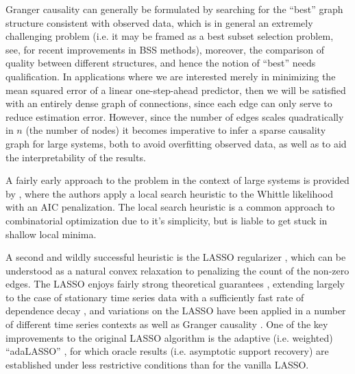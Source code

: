 \documentclass{statsoc}
\begin{document}
Granger causality can generally be formulated by searching for the
``best'' graph structure consistent with observed data, which is in
general an extremely challenging problem (i.e. it may be framed as a
best subset selection problem, see, \cite{hastie_bss_comp} for recent
improvements in BSS methods), moreover, the comparison of quality
between different structures, and hence the notion of ``best'' needs
qualification.  In applications where we are interested merely in
minimizing the mean squared error of a linear one-step-ahead
predictor, then we will be satisfied with an entirely dense graph of
connections, since each edge can only serve to reduce estimation
error.  However, since the number of edges scales quadratically in $n$
(the number of nodes) it becomes imperative to infer a sparse
causality graph for large systems, both to avoid overfitting observed
data, as well as to aid the interpretability of the results.

A fairly early approach to the problem in the context of large systems
is provided by \cite{bach2004learning}, where the authors apply a
local search heuristic to the Whittle likelihood with an AIC
penalization.  The local search heuristic is a common approach to
combinatorial optimization due to it's simplicity, but is liable to
get stuck in shallow local minima.

A second and wildly successful heuristic is the LASSO regularizer
\cite{tibshirani1996regression}, which can be understood as a natural
convex relaxation to penalizing the count of the non-zero edges.  The
LASSO enjoys fairly strong theoretical guarantees
\cite{wainwright2009sharp}, extending largely to the case of
stationary time series data with a sufficiently fast rate of
dependence decay \cite{basu2015} \cite{wong2016lasso}
\cite{autoregressive_process_modelling_via_the_lasso_procedure}, and
variations on the LASSO have been applied in a number of different
time series contexts as well as Granger causality
\cite{DBLP:journals/corr/HallacPBL17} \cite{haufe2008sparse}
\cite{bolstad2011causal} \cite{he2013stationary}
\cite{grouped_graphical_granger_modelling_for_gene_expression_regulatory_networks_discovery}.
One of the key improvements to the original LASSO algorithm is the
adaptive (i.e. weighted) ``adaLASSO'' \cite{adaptive_lasso_zou2006},
for which oracle results (i.e. asymptotic support recovery) are
established under less restrictive conditions than for the vanilla
LASSO.

\end{document}
